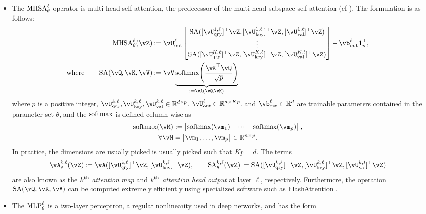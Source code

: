 \documentclass[../../book-main.tex]{subfiles}
\begin{document}
\begin{itemize}
    \item The \(\operatorname{MHSA}_{\theta}^{\ell}\) operator is multi-head-self-attention, the predecessor of the multi-head subspace self-attention (cf ). The formulation is as follows:
    \begin{align}
        \MHSA_{\theta}^{\ell}(\vZ) \label{eq:mhsa}
        &:= \vU_{\out}^{\ell}\mat{\SA([\vU_{\query}^{1, \ell}]^{\top}\vZ, [\vU_{\key}^{1, \ell}]^{\top}\vZ, [\vU_{\val}^{1, \ell}]^{\top}\vZ) \\ \vdots \\ \SA([\vU_{\query}^{K, \ell}]^{\top}\vZ, [\vU_{\key}^{K, \ell}]^{\top}\vZ, [\vU_{\val}^{K, \ell}]^{\top}\vZ)} + \vb_{\out}^{\ell}\vone_{n}^{\top}, \\
        \label{eq:self_attention}
        \text{where} \qquad \SA(\vQ, \vK, \vV)
        &:= \vV \underbrace{\softmax\rp{\frac{\vK^{\top}\vQ}{\sqrt{p}}}}_{:= \vA(\vQ, \vK)}
    \end{align}
    where \(p\) is a positive integer, \(\vU_{\query}^{k, \ell}, \vU_{\key}^{k, \ell}, \vU_{\val}^{k, \ell} \in \R^{d \times p}\), \(\vU_{\out}^{\ell} \in \R^{d \times Kp}\), and \(\vb_{\out}^{\ell} \in \R^{d}\) are trainable parameters contained in the parameter set \(\theta\), and the \(\operatorname{\mathrm{softmax}}\) is defined column-wise as 
    \begin{align}
        \softmax(\vM) 
        &:= \mat{\softmax(\vm_{1}) & \cdots & \softmax(\vm_{p})}, \\ 
        \forall \vM 
        &= \mat{\vm_{1}, \dots, \vm_{p}} \in \R^{n \times p}.
    \end{align}
    In practice, the dimensions are usually picked is usually picked such that \(Kp = d\). The terms 
    \begin{equation}
        \label{eq:attention_map}
        \vA_{\theta}^{k, \ell}(\vZ) := \vA([\vU_{\query}^{k, \ell}]^{\top}\vZ, [\vU_{\key}^{k, \ell}]^{\top}\vZ), \qquad \SA_{\theta}^{k, \ell}(\vZ) := \SA([\vU_{\query}^{k, \ell}]^{\top}\vZ, [\vU_{\key}^{k, \ell}]^{\top}\vZ, [\vU_{\val}^{k, \ell}]^{\top}\vZ)
    \end{equation}
    are also known as the \textit{\(k^{\textnormal{th}}\) attention map} and \textit{\(k^{\textnormal{th}}\) attention head output} at layer \(\ell\), respectively. Furthermore, the operation \(\SA(\vQ, \vK, \vV)\) can be computed extremely efficiently using specialized software such as FlashAttention \citep{shah2025flashattention}.
    \item The \(\operatorname{MLP}_{\theta}^{\ell}\) is a two-layer perceptron, a regular nonlinearity used in deep networks, and has the form 

\end{itemize}
\end{document}
